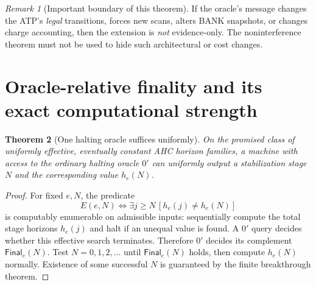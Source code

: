 \documentclass[11pt,letterpaper]{article}
\newtheorem{theorem}{Theorem}[section]
\theoremstyle{definition}
\theoremstyle{remark}
\newtheorem{remark}[theorem]{Remark}
\newcommand{\Fin}{\mathsf{Final}}
\begin{document}
\begin{remark}[Important boundary of this theorem]
If the oracle's message changes the ATP's \emph{legal} transitions, forces new scans, alters BANK snapshots, or changes charge accounting, then the extension is \emph{not} evidence-only. The noninterference theorem must not be used to hide such architectural or cost changes.
\end{remark}

\section{Oracle-relative finality and its exact computational strength}
\begin{theorem}[One halting oracle suffices uniformly]
On the promised class of uniformly effective, eventually constant AHC horizon families, a machine with access to the ordinary halting oracle $0'$ can uniformly output a stabilization stage $N$ and the corresponding value $h_e(N)$.
\end{theorem}
\begin{proof}
For fixed $e,N$, the predicate
\[
E(e,N)\iff\exists j\ge N\,[h_e(j)\ne h_e(N)]
\]
is computably enumerable on admissible inputs: sequentially compute the total stage horizons $h_e(j)$ and halt if an unequal value is found. A $0'$ query decides whether this effective search terminates. Therefore $0'$ decides its complement $\Fin_e(N)$. Test $N=0,1,2,\dots$ until $\Fin_e(N)$ holds, then compute $h_e(N)$ normally. Existence of some successful $N$ is guaranteed by the finite breakthrough theorem.
\end{proof}
\end{document}

